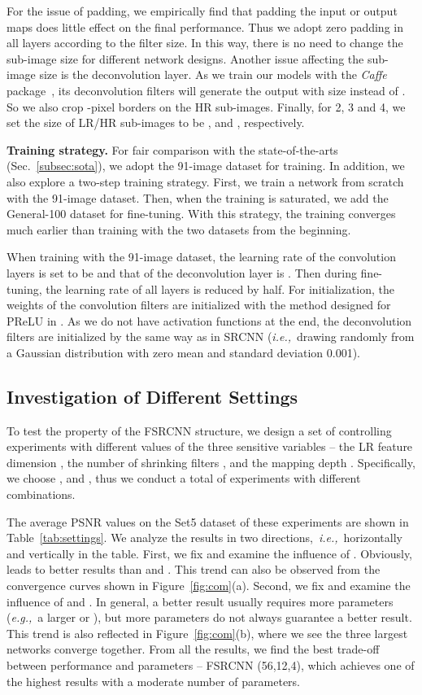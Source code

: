 \documentclass[runningheads]{llncs}
\newcommand{\eg}{\emph{e.g.,}}
\newcommand{\ie}{\emph{i.e.,}}
\begin{document}
For the issue of padding, we empirically find that padding the input or output maps does little effect on the final performance. Thus we adopt zero padding in all layers according to the filter size. In this way, there is no need to change the sub-image size for different network designs.
Another issue affecting the sub-image size is the deconvolution layer. As we train our models with the \textit{Caffe} package~\cite{Jia2014}, its deconvolution filters will generate the output with size  instead of . So we also crop -pixel borders on the HR sub-images. Finally, for 2, 3 and 4, we set the size of LR/HR sub-images to be ,  and , respectively.

\noindent
\textbf{Training strategy.}
For fair comparison with the state-of-the-arts (Sec.~\ref{subsec:sota}), we adopt the 91-image dataset for training. In addition, we also explore a two-step training strategy. First, we train a network from scratch with the 91-image dataset. Then, when the training is saturated, we add the General-100 dataset for fine-tuning. With this strategy, the training converges much earlier than training with the two datasets from the beginning.

When training with the 91-image dataset, the learning rate of the convolution layers is set to be  and that of the deconvolution layer is . Then during fine-tuning, the learning rate of all layers is reduced by half. For initialization, the weights of the convolution filters are initialized with the method designed for PReLU in \cite{He2015}. As we do not have activation functions at the end, the deconvolution filters are initialized by the same way as in SRCNN (\ie~drawing randomly from a Gaussian distribution with zero mean and standard deviation 0.001).

\subsection{Investigation of Different Settings}
\label{sec:Investigation}
To test the property of the FSRCNN structure, we design a set of controlling experiments with different values of the three sensitive variables -- the LR feature dimension , the number of shrinking filters , and the mapping depth . Specifically, we choose ,  and , thus we conduct a total of  experiments with different combinations.

The average PSNR values on the Set5 dataset of these experiments are shown in Table~\ref{tab:settings}. We analyze the results in two directions,~\ie~horizontally and vertically in the table. First, we fix  and examine the influence of . Obviously,  leads to better results than  and . This trend can also be observed from the convergence curves shown in Figure~\ref{fig:com}(a).
Second, we fix  and examine the influence of  and . In general, a better result usually requires more parameters (\eg~a larger  or ), but more parameters do not always guarantee a better result. This trend is also reflected in Figure~\ref{fig:com}(b), where we see the three largest networks converge together. From all the results, we find the best trade-off between performance and parameters -- FSRCNN (56,12,4), which achieves one of the highest results with a moderate number of parameters.
\end{document}
